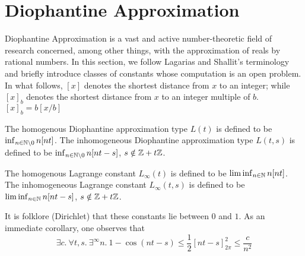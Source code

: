 \section{Diophantine Approximation}
\label{section:diophantine}

Diophantine Approximation is a vast and active number-theoretic field of research concerned, among other things, with the approximation of reals by rational numbers. In this section, we follow Lagarias and Shallit’s terminology \cite{dio-constants} and briefly introduce classes of constants whose computation is an open problem. In what follows, $[x]$ denotes the shortest distance from $x$ to an integer; while $[x]_b$ denotes the shortest distance from $x$ to an integer multiple of $b$. $[x]_b = b[x/b]$

\begin{definition}
\label{def:L}
The homogenous Diophantine approximation type $L(t)$ is defined to be $\inf_{n \in \mathbb{N} \backslash{0}} n[nt]$. The inhomogeneous Diophantine approximation type $L(t, s)$ is defined to be $\inf_{n \in \mathbb{N} \backslash{0}} n[nt - s]$, $s \notin \mathbb{Z} + t\mathbb{Z}$. 
\end{definition} 

\begin{definition}
\label{def:Linfty}
The homogenous Lagrange constant $L_\infty(t)$ is defined to be $\liminf_{n \in \mathbb{N}} n[nt]$. The inhomogeneous Lagrange constant $L_\infty(t, s)$ is defined to be\\ $\liminf_{n \in \mathbb{N}} n[nt - s]$, $s \notin \mathbb{Z} + t\mathbb{Z}$.
\end{definition} 

It is folklore (Dirichlet) that these constants lie between $0$ and $1$. As an immediate corollary, one observes that
\begin{equation}
\label{eq:quadraticdecay}
\exists c.~\forall t, s.~ \exists^\infty n. ~ 1 - \cos(nt - s) \le \frac{1}{2}\left[nt - s \right]_{2\pi}^2 \le \frac{c}{n^2}
\end{equation}

